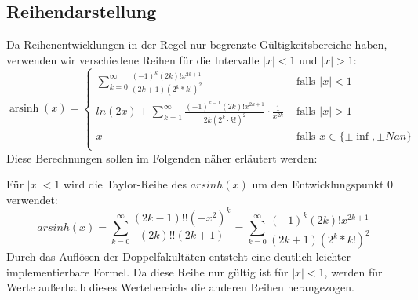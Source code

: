 \documentclass[course=erap] {aspdoc}
\begin{document}
     \subsection{Reihendarstellung}
     Da Reihenentwicklungen in der Regel nur begrenzte Gültigkeitsbereiche haben, verwenden wir verschiedene Reihen für die Intervalle $|x| < 1$ und $|x| > 1$:
       \[ \operatorname{arsinh}(x) =
     \begin{cases}
         \sum_{k = 0}^{\infty} \frac{(-1)^k(2k)!x^{2k + 1}}{(2k + 1)(2^k*k!)^2}     & \text{ falls } |x| < 1 \\
         ln(2x) + \sum_{k = 1}^{\infty} \frac{(-1)^{k - 1}(2k)!x^{2k + 1}}{2k(2^k\cdot k!)^2} \cdot \frac{1}{x^{2k}}  & \text{ falls } |x| >1 \\
         x     & \text{ falls } x \in \{\pm\inf, \pm Nan\}\\
     \end{cases}\]
     Diese Berechnungen sollen im Folgenden näher erläutert werden:
     
     Für $|x| < 1$ wird die Taylor-Reihe des $arsinh(x)$ um den Entwicklungspunkt 0 verwendet:
     \[
         arsinh(x) = \sum_{k = 0}^{\infty} \frac{(2k-1)!!(-x^2)^k}{(2k)!!(2k + 1)}
         = \sum_{k = 0}^{\infty} \frac{(-1)^k(2k)!x^{2k + 1}}{(2k + 1)(2^k*k!)^2}
     \]
     Durch das Auflösen der Doppelfakultäten entsteht eine deutlich leichter implementierbare Formel.
     Da diese Reihe nur gültig ist für $|x| < 1$, werden für Werte außerhalb dieses Wertebereichs die anderen Reihen herangezogen.
 
\end{document}
